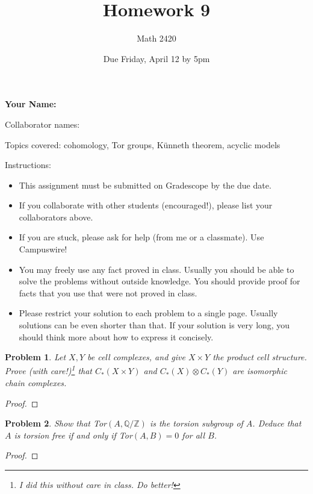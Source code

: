 \documentclass[11pt]{article}
\author{Math 2420}
\date{Due Friday, April 12 by 5pm}
\title{Homework 9}
\newtheorem{problem}{Problem}
\begin{document}
\maketitle

{\bf\Large Your Name:} 

Collaborator names: 


\vspace{.3in}
Topics covered: cohomology, Tor groups, K\"unneth theorem, acyclic models

Instructions: 
\begin{itemize}
\item This assignment must be submitted on Gradescope by the due date. 
\item If you collaborate with other students (encouraged!), please list your collaborators above. 
\item If you are stuck, please ask for help (from me or a classmate). Use Campuswire!  
\item You may freely use any fact proved in class. Usually you should be able to solve the problems without outside knowledge. You should provide proof for facts that you use that were not proved in class. 
\item Please restrict your solution to each problem to a single page. Usually solutions can be even shorter than that. If your solution is very long, you should think more about how to express it concisely.
\end{itemize}
\pagebreak 


\begin{problem}
Let $X,Y$ be cell complexes, and give $X\times Y$ the product cell structure. Prove (with care!)\footnote{I did this without care in class. Do better!} that $C_*(X\times Y)$ and $C_*(X)\otimes C_*(Y)$ are isomorphic chain complexes. 
\end{problem}

\begin{proof}

\end{proof}


\pagebreak 


\begin{problem}
Show that Tor$(A,\mathbb Q/\mathbb Z)$ is the torsion subgroup of $A$. Deduce that $A$ is torsion free if and only if Tor$(A,B)=0$ for all $B$. 
\end{problem}

\begin{proof}

\end{proof}
\end{document}
